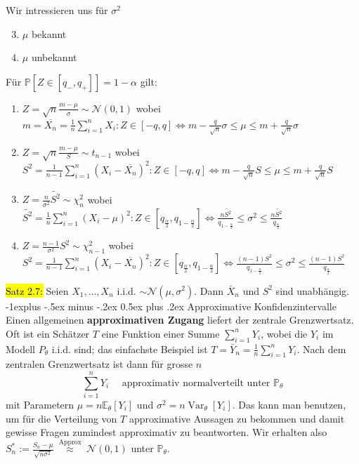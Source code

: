 \documentclass[10pt,landscape]{article}
\makeatletter
\newcommand{\yellow}[1]{\sethlcolor{yellow} \hl{#1}}
\renewcommand{\subsection}{\@startsection{subsection}{1}{0mm}%
                                {-1ex plus -.5ex minus -.2ex}%
                                {0.5ex plus .2ex}%
                                {\normalfont\large\bfseries}}
\renewcommand{\subsection}{\@startsection{subsection}{2}{0mm}%
                                {-1explus -.5ex minus -.2ex}%
                                {0.5ex plus .2ex}%
                                {\normalfont\normalsize\bfseries}}
\makeatother
\begin{document}
\begin{multicols}{3}
Wir intressieren uns für \textbf{$\sigma^2$}
\begin{enumerate}
    \setcounter{enumi}{2}
    \item $\mu$ bekannt
    \item $\mu$ unbekannt
\end{enumerate}

Für $\mathbb{P}[Z \in [q_{-}, q_{+}]] = 1 - \alpha$ gilt:
\begin{enumerate}
    \item $Z = \sqrt{n}\frac{m - \mu}{\sigma} \sim \mathcal{N}\left(0, 1\right)$ wobei $m = \overline{X_n} = \frac{1}{n}\sum_{i = 1}^nX_i: Z \in [-q, q] \iff
    m - \frac{q}{\sqrt{n}}\sigma \leq \mu \leq m +\frac{q}{\sqrt{n}}\sigma$
    \item $Z = \sqrt{n}\frac{m - \mu}{S} \sim t_{n - 1}$ wobei $S^2 =  \frac{1}{n - 1}\sum_{i = 1}^n(X_i - \overline{X_n})^2: Z \in [-q, q] \iff
    m - \frac{q}{\sqrt{n}}S \leq \mu \leq m +\frac{q}{\sqrt{n}}S$
    \item $Z = \frac{n}{\sigma^2} \tilde{S^2}\sim \chi^{2}_{n}$ wobei $\tilde{S^2} =  \frac{1}{n}\sum_{i = 1}^n(X_i - \mu)^2: Z \in [q_{\frac{\alpha}{2}}, q_{1-\frac{\alpha}{2}}] \iff
    \frac{n\tilde{S^2}}{q_{1-\frac{\alpha}{2}}} \leq \sigma^2 \leq \frac{n\tilde{S^2}}{q_{\frac{\alpha}{2}}}$
    \item $Z = \frac{n - 1}{\sigma^2}S^2 \sim \chi^{2}_{n - 1}$ wobei $S^2 =  \frac{1}{n - 1}\sum_{i = 1}^n(X_i - \overline{X_n})^2: Z \in [q_{\frac{\alpha}{2}}, q_{1-\frac{\alpha}{2}}] \iff
    \frac{(n - 1)S^2}{q_{1-\frac{\alpha}{2}}} \leq \sigma^2 \leq \frac{(n -1)S^2}{q_{\frac{\alpha}{2}}}$
\end{enumerate}

\yellow{Satz 2.7:} Seien $X_{1}, \ldots, X_{n}$ i.i.d. $\sim \mathcal{N}\left(\mu, \sigma^{2}\right) .$ Dann $\bar{X}_{n}$ und $S^{2}$ sind unabhängig.
\subsection{Approximative Konfidenzintervalle}
Einen allgemeinen\textbf{ approximativen Zugang} liefert der zentrale Grenzwertsatz. Oft ist ein Schätzer $T$ eine Funktion einer Summe $\sum_{i=1}^{n} Y_{i}$, wobei die $Y_{i}$ im Modell $P_{\theta}$ i.i.d. sind; das einfachste Beispiel ist $T=\bar{Y}_{n}=\frac{1}{n} \sum_{i=1}^{n} Y_{i}$. Nach dem zentralen Grenzwertsatz ist dann für grosse $n$
$$
\sum_{i=1}^{n} Y_{i} \quad \text { approximativ normalverteilt unter } \mathbb{P}_{\theta}
$$
mit Parametern $\mu=n \mathbb{E}_{\theta}\left[Y_{i}\right]$ und $\sigma^{2}=n \operatorname{Var}_{\theta}\left[Y_{i}\right]$. 
Das kann man benutzen, um für die Verteilung von $T$ approximative Aussagen zu bekommen und damit gewisse Fragen 
zumindest approximativ zu beantworten. Wir erhalten also $S_{n}^{*}:=\frac{S_{n}- \mu}{\sqrt{n \sigma^2}} \stackrel{\text { Approx }}{\approx} \mathcal{N}(0,1)$ unter $\mathbb{P}_{\theta}$.\\

\end{multicols}
\end{document}
